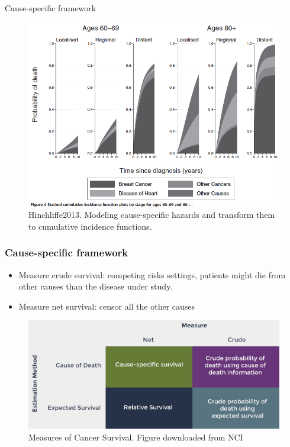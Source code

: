 \documentclass{beamer}
\begin{document}
\begin{frame}{Cause-specific framework}
\begin{figure}
    \centering
    \includegraphics[scale=0.3]{compete.png}
    \caption{Hinchliffe2013. Modeling cause-specific hazards and transform them to cumulative incidence functions.}
    \label{fig:my_label}
\end{figure}
    
\end{frame}
\begin{frame}
\frametitle{Cause-specific framework}
\begin{itemize}
\item Measure crude survival: competing risks settings, patients might die from other causes than the disease under study.

\item Measure net survival: censor all the other causes 

\end{itemize}
\begin{figure}
    \centering
    \includegraphics[scale=0.3]{survival_table.jpg}
    \caption{Measures of Cancer Survival. Figure downloaded from NCI}
    \label{fig:my_label}
\end{figure}
\end{frame}
\end{document}
